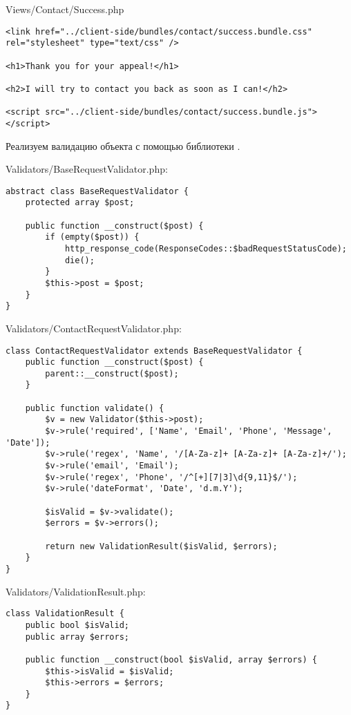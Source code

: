 \documentclass[a4paper,14pt]{extarticle}
\begin{document}
Views/Contact/Success.php
\begin{lstlisting}
<link href="../client-side/bundles/contact/success.bundle.css" rel="stylesheet" type="text/css" />

<h1>Thank you for your appeal!</h1>

<h2>I will try to contact you back as soon as I can!</h2>

<script src="../client-side/bundles/contact/success.bundle.js"></script>
\end{lstlisting}

Реализуем валидацию объекта  с помощью библиотеки .

Validators/BaseRequestValidator.php:
\begin{lstlisting}
abstract class BaseRequestValidator {
    protected array $post;

    public function __construct($post) {
        if (empty($post)) {
            http_response_code(ResponseCodes::$badRequestStatusCode);
            die();
        }
        $this->post = $post;
    }
}
\end{lstlisting}

Validators/ContactRequestValidator.php:
\begin{lstlisting}
class ContactRequestValidator extends BaseRequestValidator {
    public function __construct($post) {
        parent::__construct($post);
    }

    public function validate() {
        $v = new Validator($this->post);
        $v->rule('required', ['Name', 'Email', 'Phone', 'Message', 'Date']);
        $v->rule('regex', 'Name', '/[A-Za-z]+ [A-Za-z]+ [A-Za-z]+/');
        $v->rule('email', 'Email');
        $v->rule('regex', 'Phone', '/^[+][7|3]\d{9,11}$/');
        $v->rule('dateFormat', 'Date', 'd.m.Y');

        $isValid = $v->validate();
        $errors = $v->errors();

        return new ValidationResult($isValid, $errors);
    }
}
\end{lstlisting}

Validators/ValidationResult.php:
\begin{lstlisting}
class ValidationResult {
    public bool $isValid;
    public array $errors;

    public function __construct(bool $isValid, array $errors) {
        $this->isValid = $isValid;
        $this->errors = $errors;
    }
}
\end{lstlisting}
\end{document}
